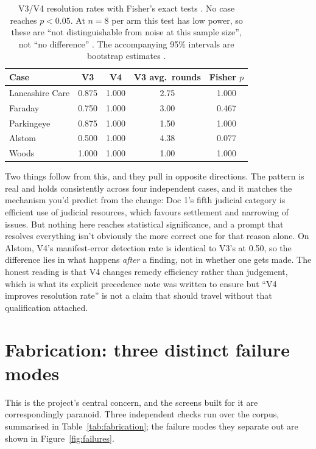 \begin{table}[htbp]
\centering
\footnotesize
\caption[Ablation significance]{V3/V4 resolution rates with Fisher's exact tests
\citep{fisher1922interpretation}. No case reaches $p<0.05$. At $n=8$ per arm this
test has low power, so these are ``not distinguishable from noise at this sample
size'', not ``no difference'' \citep{dror2018hitchhiker}. The accompanying 95\%
intervals are bootstrap estimates \citep{efron1993bootstrap}.}
\label{tab:ablation}
\begin{tabular}{|l|c|c|c|c|}
\hline
\textbf{Case} & \textbf{V3} & \textbf{V4} & \textbf{V3 avg.\ rounds} & \textbf{Fisher $p$} \\
\hline
Lancashire Care & 0.875 & 1.000 & 2.75 & 1.000 \\
\hline
Faraday & 0.750 & 1.000 & 3.00 & 0.467 \\
\hline
Parkingeye & 0.875 & 1.000 & 1.50 & 1.000 \\
\hline
Alstom & 0.500 & 1.000 & 4.38 & 0.077 \\
\hline
Woods & 1.000 & 1.000 & 1.00 & 1.000 \\
\hline
\end{tabular}
\end{table}

Two things follow from this, and they pull in opposite directions. The pattern
is real and holds consistently across four independent cases, and it matches the
mechanism you'd predict from the change: Doc 1's fifth judicial category is
efficient use of judicial resources, which favours settlement and narrowing of
issues. But nothing here reaches statistical significance, and a prompt that
resolves everything isn't obviously the more correct one for that reason alone.
On Alstom, V4's manifest-error detection rate is identical to V3's at 0.50, so
the difference lies in what happens \emph{after} a finding, not in
whether one gets made. The honest reading is that V4 changes remedy
efficiency rather than judgement, which is what its explicit precedence note was
written to ensure but ``V4 improves resolution rate'' is not a claim that should
travel without that qualification attached.

\section{Fabrication: three distinct failure modes}
\label{sec:fabrication}

This is the project's central concern, and the screens built for it are
correspondingly paranoid. Three independent checks run over the corpus,
summarised in Table~\ref{tab:fabrication}; the failure modes they separate out
are shown in Figure~\ref{fig:failures}.

